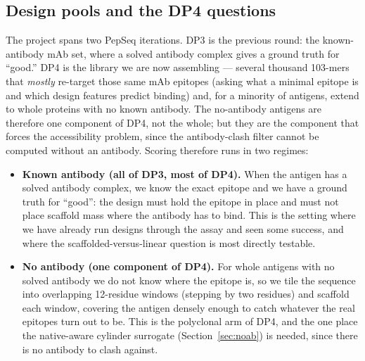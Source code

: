 \subsection{Design pools and the DP4 questions}
The project spans two PepSeq iterations. DP3 is the previous round: the known-antibody mAb
set, where a solved antibody complex gives a ground truth for ``good.'' DP4 is the library we
are now assembling --- several thousand 103-mers that \emph{mostly} re-target those same mAb
epitopes (asking what a minimal epitope is and which design features predict binding) and, for
a minority of antigens, extend to whole proteins with no known antibody. The no-antibody
antigens are therefore one component of DP4, not the whole; but they are the component that
forces the accessibility problem, since the antibody-clash filter cannot be computed without an
antibody. Scoring therefore runs in two regimes:
\begin{itemize}
  \item \textbf{Known antibody (all of DP3, most of DP4).} When the antigen has a solved
  antibody complex, we know the exact epitope and we have a ground truth for ``good'': the
  design must hold the epitope in place and must not place scaffold mass where the antibody
  has to bind. This is the setting where we have already run designs through the assay and
  seen some success, and where the scaffolded-versus-linear question is most directly testable.
  \item \textbf{No antibody (one component of DP4).} For whole antigens with no solved
  antibody we do not know where the epitope is, so we tile the sequence into overlapping
  12-residue windows (stepping by two residues) and scaffold each window, covering the antigen
  densely enough to catch whatever the real epitopes turn out to be. This is the polyclonal
  arm of DP4, and the one place the native-aware cylinder surrogate (Section~\ref{sec:noab})
  is needed, since there is no antibody to clash against.
\end{itemize}

